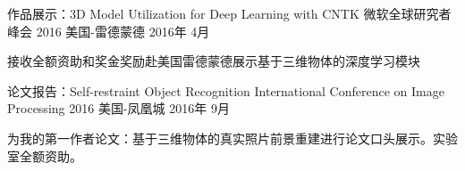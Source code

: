 


\begin{cventries}


\cventry
{作品展示：3D Model Utilization for Deep Learning with CNTK} %
{微软全球研究者峰会 2016} %
{美国-雷德蒙德} %
{2016年 4月} %
{ %
\begin{cvitems}
\item {接收全额资助和奖金奖励赴美国雷德蒙德展示基于三维物体的深度学习模块}
\end{cvitems}
}


\cventry
{论文报告：Self-restraint Object Recognition} %
{International Conference on Image Processing 2016} %
{美国-凤凰城} %
{2016年 9月} %
{ %
\begin{cvitems}
\item {为我的第一作者论文：基于三维物体的真实照片前景重建进行论文口头展示。实验室全额资助。}
\end{cvitems}
}


\end{cventries}
